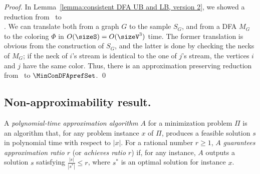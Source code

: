 \begin{proof}
	In Lemma~\ref{lemma:consistent DFA UB and LB, version 2}, we
 showed a reduction from \MinGC\ to \\ \MinConDFAprefSet.
	We can translate both from a graph $G$ to the sample $S_G$, and from a DFA $M_G$ to the coloring $\Phi$ in $O(\sizeS)=O(\sizeV^3)$ time.
	The former translation is obvious from the construction of $S_G$,
	 and the latter is done by checking the necks of $M_G$;
	if the neck of $i$'s stream is identical to the one of $j$'s
 stream, the vertices $i$ and $j$ have the same color.
%
	Thus, there is an approximation preserving reduction from \MinGC\ to $\MinConDFAprefSet$.
\qed
\end{proof}


\subsection{Non-approximability result.}



A {\em polynomial-time approximation algorithm $A$} for a minimization problem $\Pi$ is an algorithm that, for any problem instance $x$ of $\Pi$, produces a feasible solution $s$ in polynomial time with respect to $|x|$. 
For a rational number $r \geq 1$, $A$ {\em guarantees approximation ratio $r$} (or {\em achieves ratio $r$}) if, for any instance, $A$ outputs a solution $s$ satisfying $\frac{|s|}{|s^*|} \leq r$, where $s^*$ is an optimal solution for instance $x$. 



